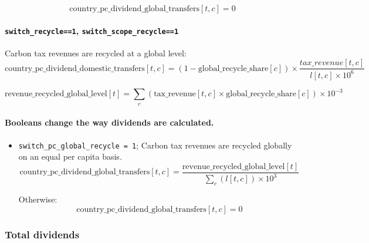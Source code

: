 \documentclass[
]{article}
\begin{document}
\begin{equation}
 \text{country\_pc\_dividend\_global\_transfers}[t,c] = 0
\end{equation}


\paragraph{\texorpdfstring{\texttt{switch\_recycle==1},
\texttt{switch\_scope\_recycle==1}}{switch\_recycle==1, switch\_scope\_recycle==1}}\label{switch_recycle1-switch_scope_recycle1}

Carbon tax revenues are recycled at a global level:
\begin{equation}
\text{country\_pc\_dividend\_domestic\_transfers}[t,c] = (1 - \text{global\_recycle\_share}[c]) \times \frac{tax\_revenue[t,c]}{l[t,c] \times 10^6} 
\end{equation}

\begin{equation}
\text{revenue\_recycled\_global\_level}[t] = \sum_c(\text{tax\_revenue}[t,c] \times \text{global\_recycle\_share}[c]) \times 10^{-3}
\end{equation}


\paragraph{\texorpdfstring{\textbf{Booleans change the way dividends are calculated}.}{Booleans change the way dividends are calculated.}}\label{booleans-change-the-way-dividends-are-calculated.}

\begin{itemize}
\item
  \texttt{switch\_pc\_global\_recycle\ =\ 1}; Carbon tax revenues are
  recycled globally on an equal per capita basis.
  \begin{equation}
 \text{country\_pc\_dividend\_global\_transfers}[t,c] = \frac{\text{revenue\_recycled\_global\_level}[t]}{\sum_c(l[t,c]) \times 10^3} 
\end{equation}


   Otherwise:
   \begin{equation}
   \text{country\_pc\_dividend\_global\_transfers}[t,c] = 0
   \end{equation}

\end{itemize}

\subsubsection{Total dividends}\label{total-dividends}
\end{document}
